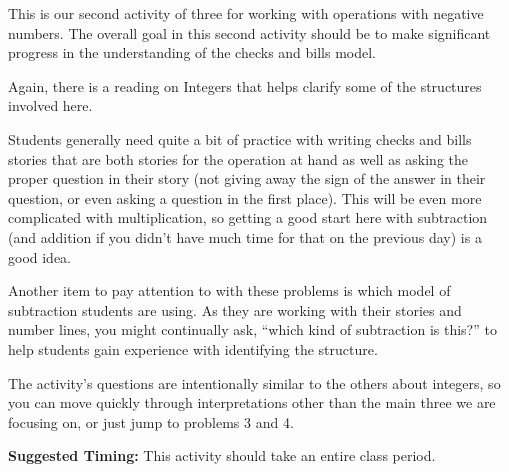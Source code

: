 \documentclass{ximera}
\begin{document}
\newpage
\begin{instructorNotes}
This is our second activity of three for working with operations with negative numbers.  The overall goal in this second activity should be to make significant progress in the understanding of the checks and bills model.

Again, there is a reading on Integers that helps clarify some of the structures involved here.

Students generally need quite a bit of practice with writing checks and bills stories that are both stories for the operation at hand as well as asking the proper question in their story (not giving away the sign of the answer in their question, or even asking a question in the first place).  This will be even more complicated with multiplication, so getting a good start here with subtraction (and addition if you didn't have much time for that on the previous day) is a good idea.

Another item to pay attention to with these problems is which model of subtraction students are using.  As they are working with their stories and number lines, you might continually ask, ``which kind of subtraction is this?'' to help students gain experience with identifying the structure.

The activity's questions are intentionally similar to the others about integers, so you can move quickly through interpretations other than the main three we are focusing on, or just jump to problems 3 and 4.

{\bf Suggested Timing:} This activity should take an entire class period.
\end{instructorNotes}
\end{document}
